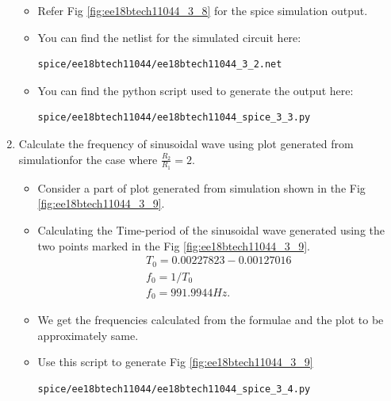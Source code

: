 \begin{enumerate}[label=\arabic*.,ref=\theenumi]
\solution

\begin{itemize}
\item Refer Fig \ref{fig:ee18btech11044_3_8} for the spice simulation output.  
\item You can find the netlist for the simulated circuit here:
\begin{lstlisting}
spice/ee18btech11044/ee18btech11044_3_2.net
\end{lstlisting}
\item You can find the python script used to generate the output here:
\begin{lstlisting}
spice/ee18btech11044/ee18btech11044_spice_3_3.py
\end{lstlisting}
\end{itemize}




\item Calculate the frequency of sinusoidal wave using plot generated from simulationfor the case where $\frac{R_2}{R_1} =2$.
 
 \solution
 \begin{itemize}
     \item Consider a part of plot generated from simulation shown in the Fig \ref{fig:ee18btech11044_3_9}.
     \item Calculating the Time-period of the sinusoidal wave generated using the two points marked in the Fig \ref{fig:ee18btech11044_3_9}.
     \begin{align}
         T_0 = 0.00227823 - 0.00127016 \\
         f_0 = 1/T_0 \\
         f_0 = 991.9944Hz.
     \end{align}
     \item We get the frequencies calculated from the formulae and the plot to be approximately same.
     \item Use this script to generate Fig \ref{fig:ee18btech11044_3_9}
\begin{lstlisting}
spice/ee18btech11044/ee18btech11044_spice_3_4.py
\end{lstlisting}
 \end{itemize}
 


\end{enumerate}
